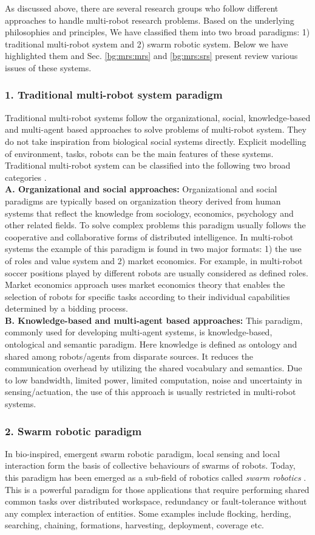 As discussed above, there are several research groups who follow different approaches to handle multi-robot research problems. Based on the underlying philosophies and principles, We have classified them into two broad paradigms: 1) traditional multi-robot system and 2) swarm robotic system. Below we have highlighted them  and Sec. \ref{bg:mrs:mrs} and \ref{bg:mrs:srs} present review various issues of these systems. 
%
\subsubsection*{1. Traditional multi-robot system paradigm}
Traditional multi-robot systems follow the organizational, social, knowledge-based and multi-agent based approaches to solve problems of multi-robot system. They do not take inspiration from biological social systems directly. Explicit modelling of environment, tasks, robots can be the main features of these systems. Traditional multi-robot system can be classified into the following two broad categories \cite{Parker2008}.\\
\textbf{A. Organizational and social approaches: }
Organizational and social paradigms are typically based on organization theory derived from human systems that reflect the knowledge from sociology, economics, psychology and other related fields. To solve complex problems this paradigm usually follows the cooperative and collaborative forms of distributed intelligence. In multi-robot systems the example of this paradigm is found in two major formats: 1) the use of roles and value system and 2) market economics.  For example, in multi-robot soccer \cite{Stone+1999} positions played by different robots are usually considered as defined roles. Market economics approach \cite{Dias+2006} uses market economics theory that enables the selection of robots for specific tasks according to their individual capabilities determined by a bidding process.\\
\textbf{B. Knowledge-based and multi-agent based approaches: }
This paradigm, commonly used for developing multi-agent systems, is knowledge-based, ontological and semantic paradigm. Here knowledge is defined as ontology and shared among robots/agents from disparate sources. It reduces the communication overhead by utilizing the shared vocabulary and semantics. Due to low bandwidth, limited power, limited computation, noise and uncertainty in sensing/actuation, the use of this approach is usually restricted in multi-robot systems.
% 
\subsubsection*{2. Swarm robotic paradigm}
In bio-inspired, emergent swarm robotic paradigm, local sensing and local interaction form the basis of collective behaviours of swarms of robots. Today, this paradigm has been emerged as a sub-field of robotics called {\em swarm robotics} \cite{Sahin+2005}. This is a powerful paradigm for those applications that require performing shared common tasks over distributed workspace, redundancy or fault-tolerance without any complex interaction of entities. Some examples include flocking, herding, searching, chaining, formations, harvesting, deployment, coverage etc. 

